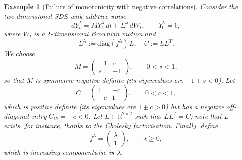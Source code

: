 \documentclass[10pt]{amsart}
\newtheorem{example}[theorem]{Example}
\numberwithin{equation}{section}
\begin{document}
 \begin{example}[Failure of monotonicity with negative correlations]
Consider the two-dimensional SDE with additive noise
$$
dY_t^\lambda = M Y_t^\lambda\,dt + \Sigma^\lambda\, dW_t,
\qquad Y_0^\lambda=0,
$$
where $W_t$ is a $2$-dimensional Brownian motion and
$$
\Sigma^\lambda := \mathrm{diag}(f^\lambda)\,L,
\quad  
C:=LL^T.
$$
We choose
$$
M=\begin{pmatrix}-1&s\\ s&-1\end{pmatrix},
\qquad 0<s<1,
$$
so that $M$ is symmetric negative definite (its eigenvalues are $-1\pm s<0$).
Let
$$
C=\begin{pmatrix}1&-c\\ -c&1\end{pmatrix},
\qquad 0<c<1,
$$
which is positive definite (its eigenvalues are $1\pm c > 0$) but has
a \emph{negative} off-diagonal entry $C_{12}=-c<0$. Let $L \in \mathbb{R}^{2 \times 2}$ such that $L L^T = C$; note that $L$ exists, for instance, thanks to the Cholesky factorisation. Finally, define 
$$
f^\lambda=\begin{pmatrix}\lambda\\ 1\end{pmatrix},
\qquad \lambda\geq 0,
$$
which is increasing componentwise in $\lambda$.



\end{example}
\end{document}
